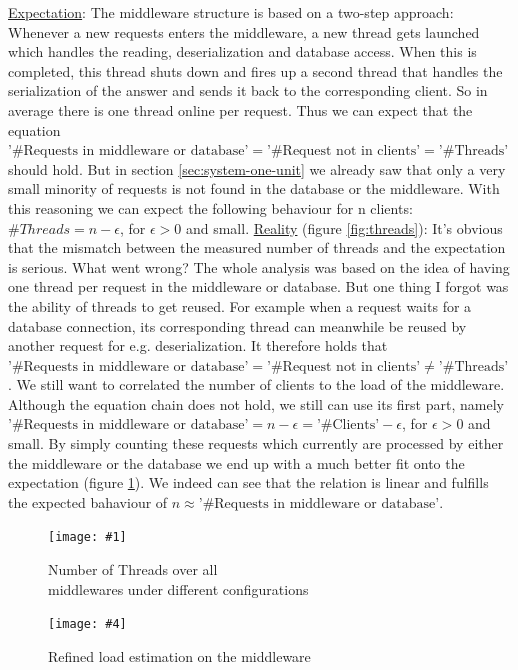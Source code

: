 \documentclass[11pt]{article}
\newcommand\TwoFig[6]{%
	\sbox\IBoxA{\texttt{[image: \#1]}}
	\sbox\IBoxB{\texttt{[image: \#4]}}%
	\ifdim\ht\IBoxA>\ht\IBoxB
	\setlength\IHeight{\ht\IBoxB}\else\setlength\IHeight{\ht\IBoxA}\fi%
	\begin{figure}[!htb]
		\minipage[t]{0.5\textwidth}\centering
		\texttt{[image: \#1]}
		\caption{#2}\label{#3}
		\endminipage \hfill
		\minipage[t]{0.5\textwidth}\centering
		\texttt{[image: \#4]}
		\caption{#5}\label{#6}
		\endminipage
	\end{figure}%
}
\begin{document}
\newline\underline{Expectation}: The middleware structure is based on a two-step approach: Whenever a new requests enters the middleware, a new thread gets launched which handles the reading, deserialization and database access. When this is completed, this thread shuts down and fires up a second thread that handles the serialization of the answer and sends it back to the corresponding client. So in average there is one thread online per request. Thus we can expect that the equation $\text{'\#Requests in middleware or database'}=\text{'\#Request not in clients'}=\text{'\#Threads'}$ should hold. But in section \ref{sec:system-one-unit} we already saw that only a very small minority of requests is not found in the database or the middleware. With this reasoning we can expect the following behaviour for n clients: $\#Threads=n-\epsilon$, for $\epsilon>0$ and small.
\newline\underline{Reality} (figure \ref{fig:threads}): It's obvious that the mismatch between the measured number of threads and the expectation is serious. What went wrong? The whole analysis was based on the idea of having one thread per request in the middleware or database. But one thing I forgot was the ability of threads to get reused. For example when a request waits for a database connection, its corresponding thread can meanwhile be reused by another request for e.g. deserialization. It therefore holds that  $\text{'\#Requests in middleware or database'}=\text{'\#Request not in clients'}\neq\text{'\#Threads'}$. We still want to correlated the number of clients to the load of the middleware. Although the equation chain does not hold, we still can use its first part, namely $\text{'\#Requests in middleware or database'}=n-\epsilon=\text{'\#Clients'}-\epsilon$, for $\epsilon>0$ and small. By simply counting these requests which currently are processed by either the middleware or the database we end up with a much better fit onto the expectation (figure \ref{fig:refined_mw_load}). We indeed can see that the relation is linear and fulfills the expected bahaviour of $n\approx\text{'\#Requests in middleware or database'}$.

\TwoFig {figures/middleware/threads} {Number of Threads over all\\middlewares under different configurations}
		{fig:threads}
		{figures/middleware/req_vs_clients_on_mw} {Refined load estimation on the middleware} {fig:refined_mw_load}
\end{document}
